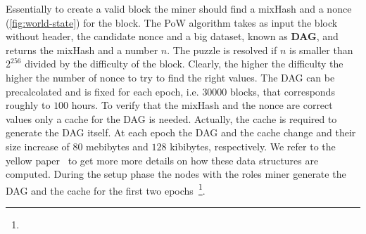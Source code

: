 Essentially to create a valid block the miner should find a mixHash and
a nonce (\autoref{fig:world-state}) for the block.
The PoW algorithm takes as input the block without header, the candidate
nonce and a big dataset, known as \textbf{DAG}, and
returns the mixHash and a number $n$. The puzzle is resolved if
$n$ is smaller than $2^{256}$ divided by the difficulty of the block. Clearly,
the higher the difficulty the higher the number of nonce to try to find the
right values. The DAG can be precalcolated and is fixed for each epoch, i.e.
$30000$ blocks, that corresponds roughly to $100$ hours. To verify
that the mixHash and the nonce are correct values only a cache for the
DAG is needed. Actually, the cache is required to generate the DAG itself.
At each epoch the DAG and the cache change and their size increase of
$80$ mebibytes and $128$ kibibytes, respectively.
We refer to the yellow paper~\cite[Appendix J]{wood2018ethereum} to get more
more details on how these data structures are computed.
During the setup phase the nodes with the roles miner generate the 
DAG and the cache for the first two epochs~\footnote{}.






